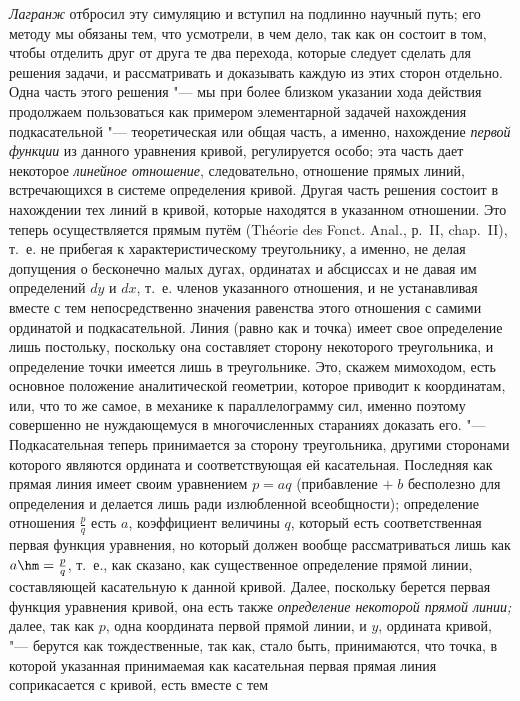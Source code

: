 {\em Лагранж} отбросил эту симуляцию и вступил на подлинно научный путь; его
методу мы обязаны тем, что усмотрели, в чем дело, так как он состоит в том,
чтобы отделить друг от друга те два перехода, которые следует сделать для
решения задачи, и рассматривать и доказывать каждую из этих сторон отдельно.
Одна часть этого решения "--- мы при более близком указании хода действия
продолжаем пользоваться как примером элементарной задачей нахождения
подкасательной "--- теоретическая или общая часть, а именно, нахождение
{\em первой функции} из данного уравнения кривой, регулируется особо; эта часть
дает некоторое {\em линейное отношение}, следовательно, отношение прямых линий,
встречающихся в системе определения кривой. Другая часть решения состоит в
нахождении тех линий в кривой, которые находятся в указанном отношении. Это
теперь осуществляется прямым путём (Théorie des Fonct. Anal., р.~II, chap.~II),
т.~е. не прибегая к характеристическому треугольнику, а именно, не делая
допущения о бесконечно малых дугах, ординатах и абсциссах и не давая им
определений $dy$ и $dx$, т.~е. членов указанного отношения, и не устанавливая
вместе с тем непосредственно значения равенства этого отношения с самими
ординатой и подкасательной. Линия (равно как и точка) имеет свое определение
лишь постольку, поскольку она составляет сторону некоторого треугольника, и
определение точки имеется лишь в треугольнике. Это, скажем мимоходом, есть
основное положение аналитической геометрии, которое приводит к координатам,
или, что то же самое, в механике к параллелограмму сил, именно поэтому
совершенно не нуждающемуся в многочисленных стараниях доказать его. "---
Подкасательная теперь принимается за сторону треугольника, другими сторонами
которого являются ордината и соответствующая ей касательная. Последняя как
прямая линия имеет своим уравнением $p=aq$ (прибавление $+\;b$ бесполезно для
определения и делается лишь ради излюбленной всеобщности); определение
отношения $\frac p q$ есть $a$, коэффициент величины $q$, который есть
соответственная первая функция уравнения, но который должен вообще
рассматриваться лишь как $a\hm=\frac p q$, т.~е., как сказано, как существенное
определение прямой линии, составляющей касательную к данной кривой. Далее,
поскольку берется первая функция уравнения кривой, она есть также
{\em определение некоторой прямой линии;} далее, так как $p$, одна координата
первой прямой линии, и $y$, ордината кривой, "--- берутся как тождественные,
так как, стало быть, принимаются, что точка, в которой указанная принимаемая
как касательная первая прямая линия соприкасается с кривой, есть вместе с тем
